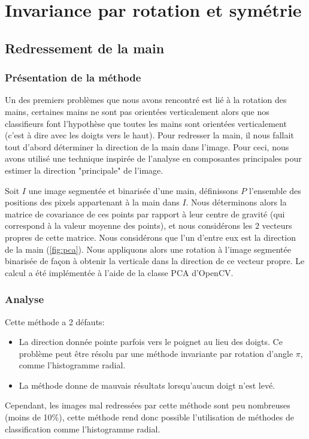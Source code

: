 \section{Invariance par rotation et symétrie}
\subsection{Redressement de la main}
\subsubsection{Présentation de la méthode}
Un des premiers problèmes que nous avons rencontré est lié à la rotation des mains, certaines mains ne sont pas orientées verticalement alors que nos classifieurs font l'hypothèse que toutes les mains sont orientées verticalement (c'est à dire avec les doigts vers le haut). Pour redresser la main, il nous fallait tout d'abord déterminer la direction de la main dans l'image. Pour ceci, nous avons utilisé une technique inspirée de l'analyse en composantes principales pour estimer la direction "principale" de l'image.

Soit $I$ une image segmentée et binarisée d'une main, définissons $P$ l'ensemble des positions des pixels appartenant à la main dans $I$. Nous déterminons alors la matrice de covariance de ces points par rapport à leur centre de gravité (qui correspond à la valeur moyenne des points), et nous considérons les $2$ vecteurs propres de cette matrice. Nous considérons que l'un d'entre eux est la direction de la main (\autoref{fig:pca}). Nous appliquons alors une rotation à l'image segmentée binarisée de façon à obtenir la verticale dans la direction de ce vecteur propre. Le calcul a été implémentée à l'aide de la classe PCA d'OpenCV.

\subsubsection{Analyse}
Cette méthode a 2 défauts:
\begin{itemize}
\item La direction donnée pointe parfois vers le poignet au lieu des doigts. Ce problème peut être résolu par une méthode invariante par rotation d'angle $\pi$, comme l'histogramme radial.
\item La méthode donne de mauvais résultats lorsqu'aucun doigt n'est levé.
\end{itemize}

Cependant, les images mal redressées par cette méthode sont peu nombreuses (moins de 10\%), cette méthode rend donc possible l'utilisation de méthodes de classification comme l'histogramme radial.

